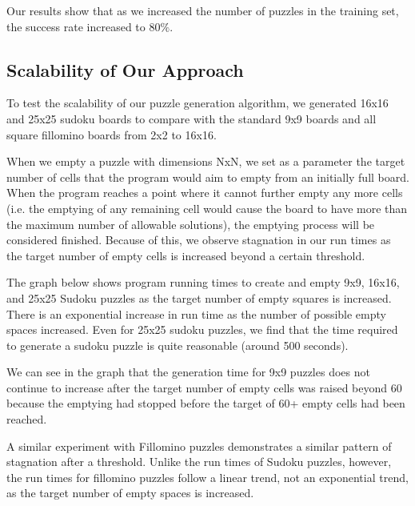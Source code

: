 Our results show that as we increased the number of puzzles in the training set, the success rate increased to $80 \%$.

\subsection{Scalability of Our Approach}

To test the scalability of our puzzle generation algorithm, we generated 16x16 and 25x25 sudoku boards to compare with the standard 9x9 boards and all square fillomino boards from 2x2 to 16x16.

When we empty a puzzle with dimensions NxN, we set as a parameter the target number of cells that the program would aim to empty from an initially full board. When the program reaches a point where it cannot further empty any more cells (i.e. the emptying of any remaining cell would cause the board to have more than the maximum number of allowable solutions), the emptying process will be considered finished. Because of this, we observe stagnation in our run times as the target number of empty cells is increased beyond a certain threshold. 

The graph below shows program running times to create and empty 9x9, 16x16, and 25x25 Sudoku puzzles as the target number of empty squares is increased. There is an exponential increase in run time as the number of possible empty spaces increased. Even for 25x25 sudoku puzzles, we find that the time required to generate a sudoku puzzle is quite reasonable (around 500 seconds).

We can see in the graph that the generation time for 9x9 puzzles does not continue to increase after the target number of empty cells was raised beyond 60 because the emptying had stopped before the target of 60+ empty cells had been reached. 

A similar experiment with Fillomino puzzles demonstrates a similar pattern of stagnation after a threshold. Unlike the run times of Sudoku puzzles, however, the run times for fillomino puzzles follow a linear trend, not an exponential trend, as the target number of empty spaces is increased.


